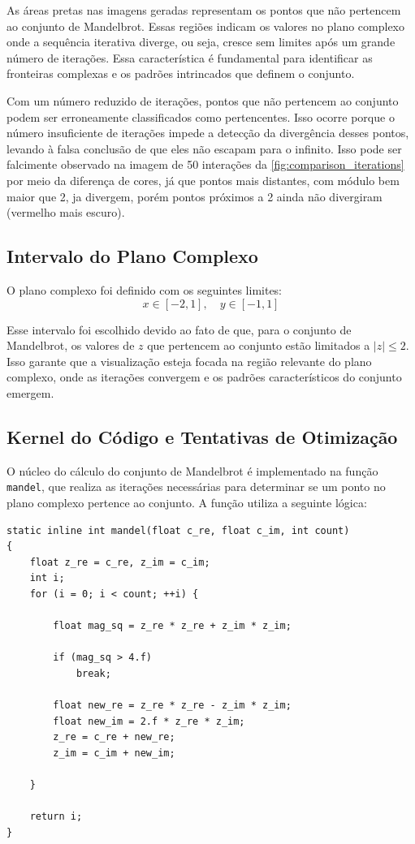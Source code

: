 As áreas pretas nas imagens geradas representam os pontos que não pertencem ao conjunto de Mandelbrot. Essas regiões indicam os valores no plano complexo onde a sequência iterativa diverge, ou seja, cresce sem limites após um grande número de iterações. Essa característica é fundamental para identificar as fronteiras complexas e os padrões intrincados que definem o conjunto.

Com um número reduzido de iterações, pontos que não pertencem ao conjunto podem ser erroneamente classificados como pertencentes. Isso ocorre porque o número insuficiente de iterações impede a detecção da divergência desses pontos, levando à falsa conclusão de que eles não escapam para o infinito. Isso pode ser falcimente observado na imagem de 50 interações da \autoref{fig:comparison_iterations} por meio da diferença de cores, já que pontos mais distantes, com módulo bem maior que 2, ja divergem, porém pontos próximos a 2 ainda não divergiram (vermelho mais escuro).

\subsection{Intervalo do Plano Complexo}

O plano complexo foi definido com os seguintes limites:
\[
x \in [-2, 1], \quad y \in [-1, 1]
\]

Esse intervalo foi escolhido devido ao fato de que, para o conjunto de Mandelbrot, os valores de \( z \) que pertencem ao conjunto estão limitados a \( |z| \leq 2 \). Isso garante que a visualização esteja focada na região relevante do plano complexo, onde as iterações convergem e os padrões característicos do conjunto emergem.


\subsection{Kernel do Código e Tentativas de Otimização}

O núcleo do cálculo do conjunto de Mandelbrot é implementado na função \texttt{mandel}\cite{intel-fractal-code}, que realiza as iterações necessárias para determinar se um ponto no plano complexo pertence ao conjunto. A função utiliza a seguinte lógica:

\begin{lstlisting}[caption=Kernel do cálculo do conjunto de Mandelbrot]
static inline int mandel(float c_re, float c_im, int count)
{
    float z_re = c_re, z_im = c_im;
    int i;
    for (i = 0; i < count; ++i) {

        float mag_sq = z_re * z_re + z_im * z_im;

        if (mag_sq > 4.f)
            break;

        float new_re = z_re * z_re - z_im * z_im;
        float new_im = 2.f * z_re * z_im;
        z_re = c_re + new_re;
        z_im = c_im + new_im;

    }

    return i;
}
\end{lstlisting}

